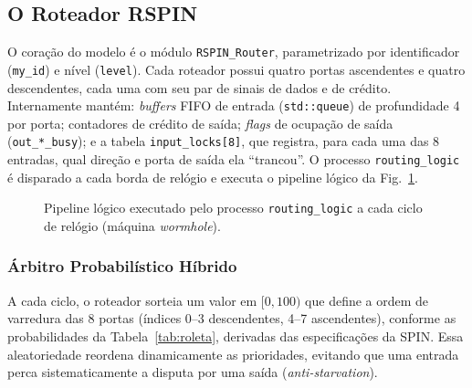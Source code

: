\documentclass[conference]{IEEEtran}
\begin{document}
\subsection{O Roteador RSPIN}
O coração do modelo é o módulo \texttt{RSPIN\_Router}, parametrizado por
identificador (\texttt{my\_id}) e nível (\texttt{level}). Cada roteador possui
quatro portas ascendentes e quatro descendentes, cada uma com seu par de sinais
de dados e de crédito. Internamente mantém: \emph{buffers} FIFO de entrada
(\texttt{std::queue}) de profundidade 4 por porta; contadores de crédito de
saída; \emph{flags} de ocupação de saída (\texttt{out\_*\_busy}); e a tabela
\texttt{input\_locks[8]}, que registra, para cada uma das 8 entradas, qual
direção e porta de saída ela ``trancou''. O processo \texttt{routing\_logic} é
disparado a cada borda de relógio e executa o pipeline lógico da
Fig.~\ref{fig:fsm}.

\begin{figure}[!t]
\centering
{}
\caption{Pipeline lógico executado pelo processo \texttt{routing\_logic} a cada
ciclo de relógio (máquina \emph{wormhole}).}
\label{fig:fsm}
\end{figure}

\subsubsection{Árbitro Probabilístico Híbrido}
A cada ciclo, o roteador sorteia um valor em $[0,100)$ que define a ordem de
varredura das 8 portas (índices 0--3 descendentes, 4--7 ascendentes), conforme
as probabilidades da Tabela~\ref{tab:roleta}, derivadas das especificações da
SPIN. Essa aleatoriedade reordena dinamicamente as prioridades, evitando que uma
entrada perca sistematicamente a disputa por uma saída (\emph{anti-starvation}).
\end{document}
